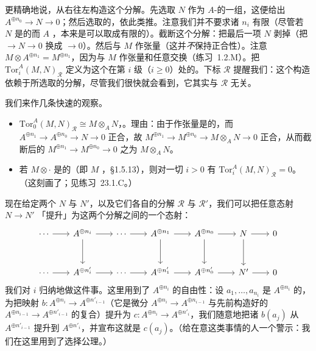 更精确地说，从右往左构造这个分解。先选取 $N$ 作为 $A$-\trModule{}的一组\trGenerator，这便给出 $A^{\oplus n_0}\to N\to 0$；然后选取\trKernel{}的\trGenerator，依此类推。注意我们并不要求诸 $n_i$ 有限（尽管若 $N$ 是\trFinitelyGenerated{}的\trModule{}而 $A$ \trNoether，本来是可以取成有限的）。截断这个分解：把最后一项 $N$ 剥掉（把 $\to N\to 0$ 换成 $\to 0$）。然后与 $M$ 作张量（这并\emph{不}保持正合性）。注意 $M\otimes A^{\oplus n_1}=M^{\oplus n_1}$，因为与 $M$ 作张量和任意\trDirectSum{}交换（\mbox{练习~1.2.M}）。把 $\mathrm{Tor}^A_i(M,N)_{\mathscr{R}}$ 定义为这个\trComplexN{}在第 $i$ 级（$i\ge 0$）处的\trHomology。下标 $\mathscr{R}$ 提醒我们：这个构造依赖于所选取的分解，尽管我们很快就会看到，它其实与 $\mathscr{R}$ 无关。

我们来作几条快速的观察。
\begin{itemize}
\item $\mathrm{Tor}^A_0(M,N)_{\mathscr{R}}\cong M\otimes_A N$，\trCanonically。理由：由于作张量是\trRightExact{}的，而 $A^{\oplus n_1}\to A^{\oplus n_0}\to N\to 0$ 正合，故 $M^{\oplus n_1}\to M^{\oplus n_0}\to M\otimes_A N\to 0$ 正合，从而截断后的\trComplexN{} $M^{\oplus n_1}\to M^{\oplus n_0}\to 0$ 之\trHomology{}为 $M\otimes_A N$。
\item 若 $M\otimes\cdot$ 是\trExact{}的（即 $M$ \trFlat，\S1.5.13），则对一切 $i>0$ 有 $\mathrm{Tor}^A_i(M,N)_{\mathscr{R}}=0$。（这刻画了\trFlatness；见\mbox{练习~23.1.C}。）
\end{itemize}

现在给定两个\trModule{} $N$ 与 $N'$，以及它们各自的分解 $\mathscr{R}$ 与 $\mathscr{R}'$，我们可以把任意态射 $N\to N'$ 「提升」为这两个分解之间的一个态射：
\[
\begin{tikzcd}[row sep=2.9em, column sep=2em]
\cdots \ar[r] & A^{\oplus n_i} \ar[r] \ar[d] & \cdots \ar[r] & A^{\oplus n_1} \ar[r] \ar[d] & A^{\oplus n_0} \ar[r] \ar[d] & N \ar[r] \ar[d] & 0 \\
\cdots \ar[r] & A^{\oplus n'_i} \ar[r] & \cdots \ar[r] & A^{\oplus n'_1} \ar[r] & A^{\oplus n'_0} \ar[r] & N' \ar[r] & 0
\end{tikzcd}
\]
我们对 $i$ 归纳地做这件事。这里用到了 $A^{\oplus n_i}$ 的自由性：设 $a_1,\dots,a_{n_i}$ 是 $A^{\oplus n_i}$ 的\trGenerator，为把映射 $b\colon A^{\oplus n_i}\to A^{\oplus n'_{i-1}}$（它是微分 $A^{\oplus n_i}\to A^{\oplus n_{i-1}}$ 与先前构造好的 $A^{\oplus n_{i-1}}\to A^{\oplus n'_{i-1}}$ 的复合）提升为 $c\colon A^{\oplus n_i}\to A^{\oplus n'_i}$，我们随意地把诸 $b(a_j)$ 从 $A^{\oplus n'_{i-1}}$ 提升到 $A^{\oplus n'_i}$，并宣布这就是 $c(a_j)$。（给在意这类事情的人一个警示：我们在这里用到了选择公理。）

